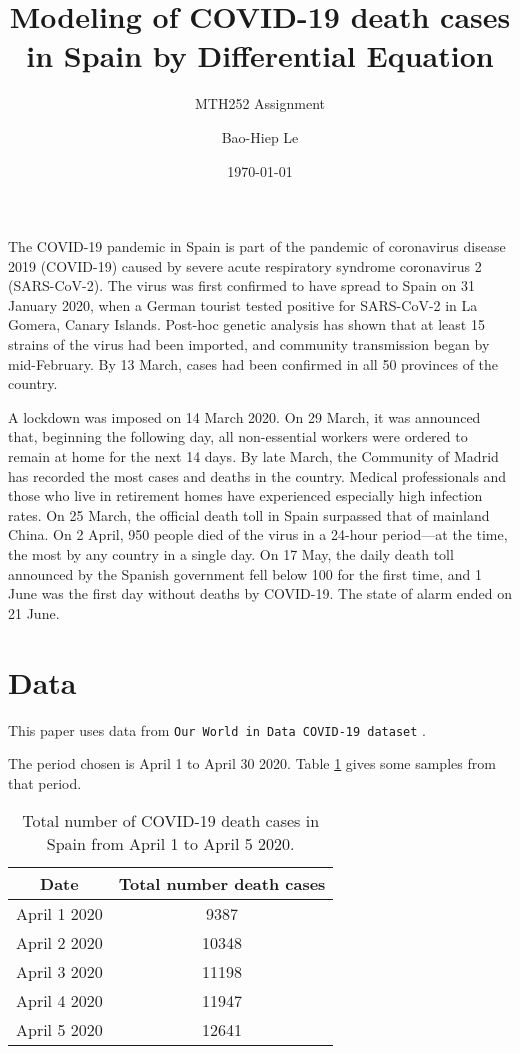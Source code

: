 \documentclass[12pt]{scrartcl}
\title{Modeling of COVID-19 death cases in Spain by Differential Equation}
\subtitle{MTH252 Assignment}
\author{Bao-Hiep Le}
\date{\today}
\begin{document}
\maketitle


The COVID-19 pandemic in Spain is part of the pandemic of coronavirus disease
2019 (COVID-19) caused by severe acute respiratory syndrome coronavirus 2
(SARS-CoV-2). The virus was first confirmed to have spread to Spain on
31 January 2020, when a German tourist tested positive for SARS-CoV-2 in
La Gomera, Canary Islands. Post-hoc genetic analysis has shown that at least
15 strains of the virus had been imported, and community transmission began by
mid-February. By 13 March, cases had been confirmed in all 50 provinces of the country.

A lockdown was imposed on 14 March 2020. On 29 March, it was announced that,
beginning the following day, all non-essential workers were ordered to remain at
home for the next 14 days. By late March, the Community of Madrid has recorded
the most cases and deaths in the country. Medical professionals and those who
live in retirement homes have experienced especially high infection rates. On
25 March, the official death toll in Spain surpassed that of mainland China.
On 2 April, 950 people died of the virus in a 24-hour period—at the time, the
most by any country in a single day. On 17 May, the daily death toll announced
by the Spanish government fell below 100 for the first time, and 1 June was the
first day without deaths by COVID-19. The state of alarm ended on 21 June.

\section*{Data}

This paper uses data from \texttt{Our World in Data COVID-19 dataset} \autocite{owid-covid-data}.

The period chosen is April 1 to April 30 2020. Table \ref{table:1} gives some samples from that period.

\begin{table}[h!]
\centering
\begin{tabular}{ |c|c| }
  \hline
  \textbf{Date} & \textbf{Total number death cases} \\
  \hline
  April 1 2020 & 9387 \\
  April 2 2020 & 10348 \\
  April 3 2020 & 11198 \\
  April 4 2020 & 11947 \\
  April 5 2020 & 12641 \\
  \hline
\end{tabular}
\caption{Total number of COVID-19 death cases in Spain from April 1 to April 5 2020.}
\label{table:1}
\end{table}
\end{document}
